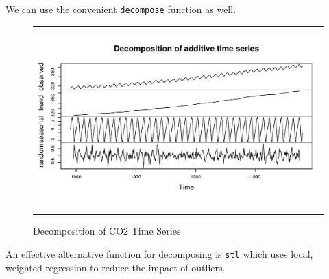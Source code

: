 \documentclass[11pt, letterpaper, twoside]{memoir}\usepackage{knitr}
\begin{document}
We can use the convenient \texttt{decompose} function as well.

\begin{figure}
\centering
\rule{4in}{1pt}
\begin{knitrout}
\color{fgcolor}\begin{kframe}
\begin{alltt}
 \hlkwb{<-} 
\end{alltt}
\end{kframe}
\includegraphics[width=\maxwidth]{figure/unnamed-chunk-108-1} 

\end{knitrout}
\caption{Decomposition of CO2 Time Series}
\label{Fig:CO2Decom}
\rule{4in}{1pt}
\end{figure}

An effective alternative function for decomposing is \texttt{stl} which uses local, weighted regression to reduce the impact of outliers.
\end{document}

